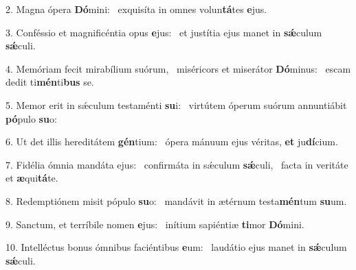 2. Magna ópera \textbf{Dó}mini: \ast\  exquisíta in omnes volun\textbf{tá}tes \textbf{e}jus.\

3. Conféssio et magnificéntia opus \textbf{e}jus: \ast\  et justítia ejus manet in \textbf{sǽ}culum \textbf{sǽ}culi.\

4. Memóriam fecit mirabílium suórum, \dag\  miséricors et miserátor \textbf{Dó}minus: \ast\  escam dedit ti\textbf{mén}ti\textbf{bus} se.\

5. Memor erit in sǽculum testaménti \textbf{su}i: \ast\  virtútem óperum suórum annuntiábit \textbf{pó}pulo \textbf{su}o:\

6. Ut det illis hereditátem \textbf{gén}tium: \ast\  ópera mánuum ejus véritas, \textbf{et} ju\textbf{dí}cium.\

7. Fidélia ómnia mandáta ejus: \dag\  confirmáta in sǽculum \textbf{sǽ}culi, \ast\  facta in veritáte et \textbf{æ}qui\textbf{tá}te.\

8. Redemptiónem misit pópulo \textbf{su}o: \ast\  mandávit in ætérnum testa\textbf{mén}tum \textbf{su}um.\

9. Sanctum, et terríbile nomen \textbf{e}jus: \ast\  inítium sapiéntiæ \textbf{ti}mor \textbf{Dó}mini.\

10. Intelléctus bonus ómnibus faciéntibus \textbf{e}um: \ast\  laudátio ejus manet in \textbf{sǽ}culum \textbf{sǽ}culi.\


